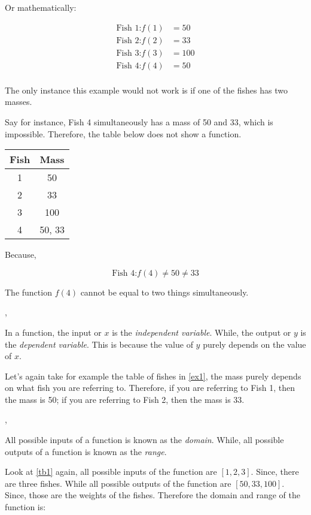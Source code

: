 Or mathematically:

\begin{align*}
    \text{Fish 1:} f(1) &= 50 \\
    \text{Fish 2:} f(2) &= 33 \\
    \text{Fish 3:} f(3) &= 100 \\    
    \text{Fish 4:} f(4) &= 50 \\    
\end{align*}

The only instance this example would not work is if one of the fishes has two masses.

Say for instance, Fish 4 simultaneously has a mass of 50 and 33, which is impossible. Therefore, the table below does not show a function.

\begin{center}
    \begin{tabular}{cc}
        \toprule
        Fish & Mass \\
        \midrule
        1 & 50 \\
        2 & 33 \\
        3 & 100 \\
        4 & 50, 33 \\
        \bottomrule
    \end{tabular}
\end{center}

Because,

\[
    \text{Fish 4:}f(4)\neq50\neq33
\]

The function \(f(4)\) cannot be equal to two things simultaneously.

\sep

In a function, the input or \(x\) is the \emph{independent variable}. While, the output or \(y\) is the \emph{dependent variable}. This is because the value of \(y\) purely depends on the value of \(x\).

Let's again take for example the table of fishes in \cref{ex1}, the mass purely depends on what fish you are referring to. Therefore, if you are referring to Fish 1, then the mass is 50; if you are referring to Fish 2, then the mass is 33.

\sep

All possible inputs of a function is known as the \emph{domain}. While, all possible outputs of a function is known as the \emph{range}.

Look at \cref{tb1} again, all possible inputs of the function are \([1,2,3]\). Since, there are three fishes. While all possible outputs of the function are \([50,33,100]\). Since, those are the weights of the fishes. Therefore the domain and range of the function is:

